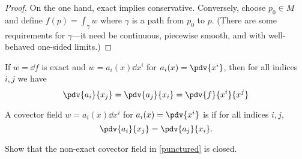 \begin{proof}
On the one hand, exact implies conservative. Conversely, choose $p_0 \in M$ and define $f(p) = \int_\gamma w$ where $\gamma$ is a path from $p_0$ to $p$.
(There are some requirements for $\gamma$---it need be continuous, piecewise smooth, and with well-behaved one-sided limits.)
\end{proof}

\begin{prop}
   If $w = \dd{f}$ is exact and $w = a_i(x) \dd{x^i}$ for $a_i(x) = \pdv{x^i}$, then for all indices $i,j$ we have
   \begin{equation*}
       \pdv{a_i}{x_j} = 
       \pdv{a_j}{x_i} =
       \pdv{f}{x^i}{x^j}
   \end{equation*}
\end{prop}

\begin{defn}
    A covector field $w = a_i(x) \dd{x^i}$ for $a_i(x) = \pdv{x^i}$ is  if for all indices $i,j$, \[\pdv{a_i}{x_j} = \pdv{a_j}{x_i}.\]
\end{defn}

\begin{todo}[]
    Show that the non-exact covector field in \ref{punctured} is closed.
\end{todo}
